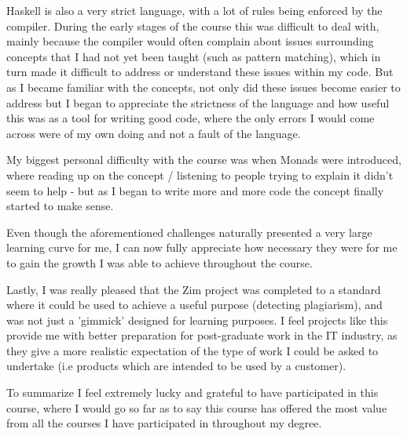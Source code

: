 \documentclass[11pt, a4paper]{article}
\begin{document}
Haskell is also a very strict language, with a lot of rules being enforced by the compiler. During the early stages of the course this was difficult to deal with, mainly because the compiler would often complain about issues surrounding concepts that I had not yet been taught (such as pattern matching), which in turn made it difficult to address or understand these issues within my code. But as I became familiar with the concepts, not only did these issues become easier to address but I began to appreciate the strictness of the language and how useful this was as a tool for writing good code, where the only errors I would come across were of my own doing and not a fault of the language. 

My biggest personal difficulty with the course was when Monads were introduced, where reading up on the concept / listening to people trying to explain it didn't seem to help - but as I began to write more and more code the concept finally started to make sense.

Even though the aforementioned challenges naturally presented a very large learning curve for me, I can now fully appreciate how necessary they were for me to gain the growth I was able to achieve throughout the course.

Lastly, I was really pleased that the Zim project was completed to a standard where it could be used to achieve a useful purpose (detecting plagiarism), and was not just a 'gimmick' designed for learning purposes. I feel projects like this provide me with better preparation for post-graduate work in the IT industry, as they give a more realistic expectation of the type of work I could be asked to undertake (i.e products which are intended to be used by a customer).

To summarize I feel extremely lucky and grateful to have participated in this course, where I would go so far as to say this course has offered the most value from all the courses I have participated in throughout my degree.  


\end{document}
